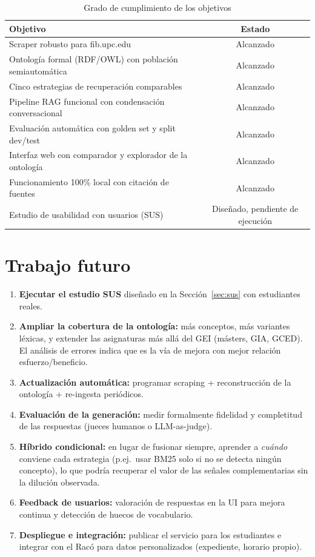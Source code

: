 \documentclass[12pt, a4paper, twoside]{report}
\begin{document}
\begin{table}[H]
\centering
\caption{Grado de cumplimiento de los objetivos}
\label{tab:objetivos}
\begin{tabularx}{\textwidth}{Xc}
\toprule
\textbf{Objetivo} & \textbf{Estado} \\
\midrule
Scraper robusto para fib.upc.edu & Alcanzado \\
Ontolog\'ia formal (RDF/OWL) con poblaci\'on semiautom\'atica & Alcanzado \\
Cinco estrategias de recuperaci\'on comparables & Alcanzado \\
Pipeline RAG funcional con condensaci\'on conversacional & Alcanzado \\
Evaluaci\'on autom\'atica con golden set y split dev/test & Alcanzado \\
Interfaz web con comparador y explorador de la ontolog\'ia & Alcanzado \\
Funcionamiento 100\% local con citaci\'on de fuentes & Alcanzado \\
Estudio de usabilidad con usuarios (SUS) & Dise\~nado, pendiente de ejecuci\'on \\
\bottomrule
\end{tabularx}
\end{table}

\section{Trabajo futuro}

\begin{enumerate}
  \item \textbf{Ejecutar el estudio SUS} dise\~nado en la Secci\'on~\ref{sec:sus} con estudiantes reales.
  \item \textbf{Ampliar la cobertura de la ontolog\'ia:} m\'as conceptos, m\'as variantes l\'exicas, y extender las asignaturas m\'as all\'a del GEI (m\'asters, GIA, GCED). El an\'alisis de errores indica que es la v\'ia de mejora con mejor relaci\'on esfuerzo/beneficio.
  \item \textbf{Actualizaci\'on autom\'atica:} programar scraping + reconstrucci\'on de la ontolog\'ia + re-ingesta peri\'odicos.
  \item \textbf{Evaluaci\'on de la generaci\'on:} medir formalmente fidelidad y completitud de las respuestas (jueces humanos o LLM-as-judge).
  \item \textbf{H\'ibrido condicional:} en lugar de fusionar siempre, aprender a \textit{cu\'ando} conviene cada estrategia (p.ej.\ usar BM25 solo si no se detecta ning\'un concepto), lo que podr\'ia recuperar el valor de las se\~nales complementarias sin la diluci\'on observada.
  \item \textbf{Feedback de usuarios:} valoraci\'on de respuestas en la UI para mejora continua y detecci\'on de huecos de vocabulario.
  \item \textbf{Despliegue e integraci\'on:} publicar el servicio para los estudiantes e integrar con el Rac\'o para datos personalizados (expediente, horario propio).
\end{enumerate}
\end{document}
